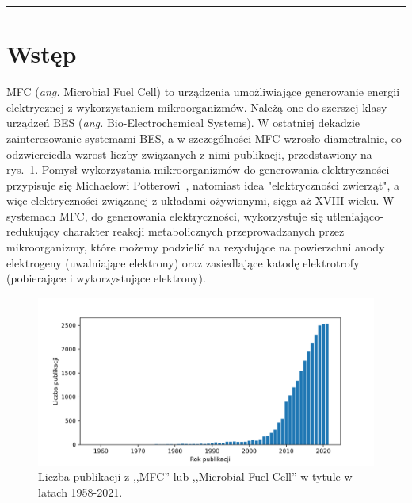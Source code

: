 \documentclass[12pt, a4paper]{article}
\begin{document}


\newpage


\tableofcontents

\begin{abstract}
    \noindent
    \lipsum[1]
\end{abstract}

\rule{\textwidth}{0.4pt}

\begin{otherlanguage}{british}
    \begin{abstract}
        \noindent
        \lipsum[1] 
    \end{abstract}
\end{otherlanguage}

\section{Wstęp}
MFC (\textit{ang.} Microbial Fuel Cell) to urządzenia umożliwiające generowanie energii elektrycznej z wykorzystaniem
mikroorganizmów. Należą one do szerszej klasy urządzeń BES (\textit{ang.} Bio-Electrochemical Systems).
W ostatniej dekadzie zainteresowanie systemami BES, a w szczególności MFC wzrosło diametralnie, co odzwierciedla wzrost
liczby związanych z nimi publikacji, przedstawiony na rys.~\ref{fig:1}. Pomysł wykorzystania mikroorganizmów do
generowania elektryczności przypisuje się Michaelowi Potterowi~\cite{Potter1911}, natomiast idea "elektryczności
zwierząt", a więc elektryczności związanej z układami ożywionymi, sięga aż XVIII wieku. W systemach MFC, do generowania
elektryczności, wykorzystuje się utleniająco-redukujący charakter reakcji metabolicznych przeprowadzanych przez
mikroorganizmy, które możemy podzielić na rezydujące na powierzchni anody elektrogeny (uwalniające elektrony)
oraz zasiedlające katodę elektrotrofy (pobierające i wykorzystujące elektrony).

\begin{figure}[!b]
    \centering
    \includegraphics[width=\textwidth]{figures/pub.png}
    \caption{Liczba publikacji z ,,MFC'' lub ,,Microbial Fuel Cell'' w tytule w latach 1958-2021.}
    \label{fig:1}
\end{figure}
\end{document}
